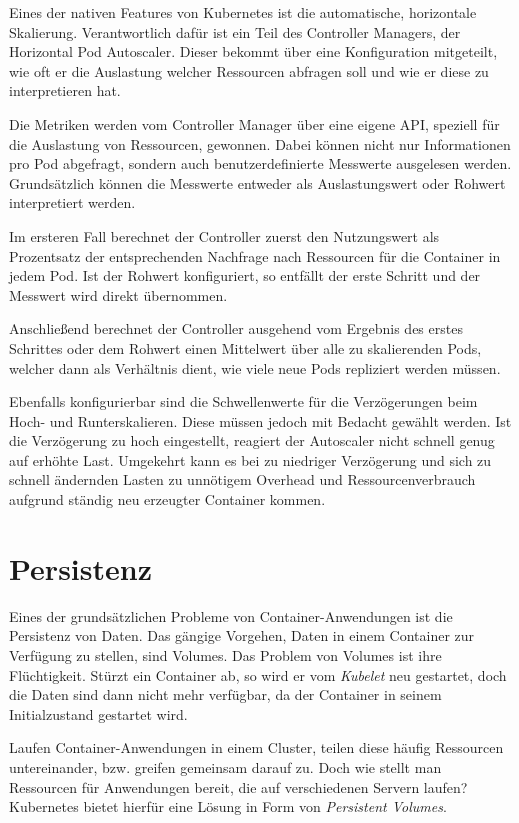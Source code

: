 Eines der nativen Features von Kubernetes ist die automatische, horizontale Skalierung.
Verantwortlich dafür ist ein Teil des Controller Managers, der \glqq{}Horizontal Pod Autoscaler\grqq{}.
Dieser bekommt über eine Konfiguration mitgeteilt, wie oft er die Auslastung welcher Ressourcen abfragen soll und wie er diese zu interpretieren hat.

Die Metriken werden vom Controller Manager über eine eigene API, speziell für die Auslastung von Ressourcen, gewonnen.
Dabei können nicht nur Informationen pro Pod abgefragt, sondern auch benutzerdefinierte Messwerte ausgelesen werden.
Grundsätzlich können die Messwerte entweder als Auslastungswert oder Rohwert interpretiert werden.

Im ersteren Fall berechnet der Controller zuerst den Nutzungswert als Prozentsatz der entsprechenden Nachfrage nach Ressourcen für die Container in jedem Pod.
Ist der Rohwert konfiguriert, so entfällt der erste Schritt und der Messwert wird direkt übernommen.

Anschließend berechnet der Controller ausgehend vom Ergebnis des erstes Schrittes oder dem Rohwert einen Mittelwert über alle zu skalierenden Pods, welcher dann als Verhältnis dient, wie viele neue Pods repliziert werden müssen.

Ebenfalls konfigurierbar sind die Schwellenwerte für die Verzögerungen beim Hoch- und Runterskalieren.
Diese müssen jedoch mit Bedacht gewählt werden.
Ist die Verzögerung zu hoch eingestellt, reagiert der Autoscaler nicht schnell genug auf erhöhte Last.
Umgekehrt kann es bei zu niedriger Verzögerung und sich zu schnell ändernden Lasten zu unnötigem Overhead und Ressourcenverbrauch aufgrund ständig neu erzeugter Container kommen.

\section{Persistenz}

Eines der grundsätzlichen Probleme von Container-Anwendungen ist die Persistenz von Daten.
Das gängige Vorgehen, Daten in einem Container zur Verfügung zu stellen, sind Volumes.
Das Problem von Volumes ist ihre Flüchtigkeit.
Stürzt ein Container ab, so wird er vom \textit{Kubelet} neu gestartet, doch die Daten sind dann nicht mehr verfügbar, da der Container in seinem Initialzustand gestartet wird.

Laufen Container-Anwendungen in einem Cluster, teilen diese häufig Ressourcen untereinander, bzw. greifen gemeinsam darauf zu.
Doch wie stellt man Ressourcen für Anwendungen bereit, die auf verschiedenen Servern laufen?
Kubernetes bietet hierfür eine Lösung in Form von \textit{Persistent Volumes}.

